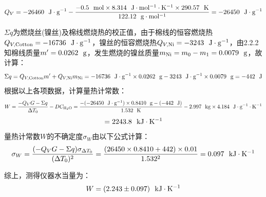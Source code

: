 \documentclass[12pt]{article}
\begin{document}
			$$
			Q_{V}=-26460\ \ {\rm J\cdot g^{-1}}-\frac{-0.5\ \ {\rm mol}\times 8.314\ \ {\rm J\cdot mol^{-1}\cdot K^{-1}}\times 290.57\ \ {\rm K}}{122.12\ \ {\rm g\cdot mol^{-1}}}=-26450\ \ {\rm J\cdot g^{-1}}
			$$
			\par
			$\Sigma q$为燃烧丝(镍丝)及棉线燃烧热的校正值，由于棉线的恒容燃烧热$Q_{V, {\rm Cotton}}=-16736\ \ {\rm J\cdot g^{-1}}$，镍丝的恒容燃烧热$Q_{V, {\rm Ni}}=-3243\ \ {\rm J\cdot g^{-1}}$，由2.2.2知棉线质量$m^{\prime}=0.0262\ \ {\rm g}$，发生燃烧的镍丝质量$m_{\rm Ni}=m_{0}-m_{1}=0.0079\ \ {\rm g}$，故计算：
			$$
			\Sigma q=Q_{V, {\rm Cotton}}m^{\prime}+Q_{V, {\rm Ni}}m_{\rm Ni}=-16736\ \ {\rm J\cdot g^{-1}}\times 0.0262\ \ {\rm g}-3243\ \ {\rm J\cdot g^{-1}}\times 0.0079\ \ {\rm g}=-442\ \ {\rm J}
			$$
			根据以上各项数据，计算量热计常数：
			$$
			W=\frac{-Q_{V}G-\Sigma q}{\Delta T_{0}}-DC_{\rm H_{2}O}=\frac{-(-26450\ \ {\rm J\cdot g^{-1}})\times 0.8410\ \ {\rm g}-(-442\ \ {\rm J})}{1.532\ \ {\rm K}}-2.997\ \ {\rm kg}\times 4.184\ \ {\rm J\cdot g^{-1}\cdot K^{-1}}
			$$
			$$
			=2243.8\ \ {\rm kJ\cdot K^{-1}}
			$$
			量热计常数$W$的不确定度$\sigma_{W}$由以下公式计算：
			$$
			\sigma_{W}=\frac{(-Q_{V}G-\Sigma q)\sigma_{\Delta T_{0}}}{(\Delta T_{0})^{2}}=\frac{(26450\times 0.8410+442)\times 0.01}{1.532^{2}}= 0.097\ \ {\rm kJ\cdot K^{-1}}
			$$
			\par
			综上，测得仪器水当量为：
			$$
			W=(2.243\pm 0.097)\ \ {\rm kJ\cdot K^{-1}}
			$$
\end{document}
